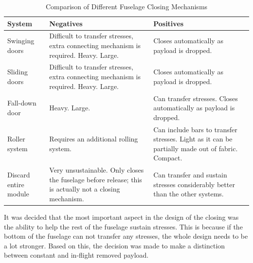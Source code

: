 \begin{table}[ht]
    \centering
    \caption{Comparison of Different Fuselage Closing Mechanisms}
    \label{tab:fuse_clos_comp}
    \begin{tabularx}{\textwidth}{>{\small}l L L}
    \toprule
    \textbf{System} & \textbf{Negatives} & \textbf{Positives}
    \\ \midrule
    Swinging doors & Difficult to transfer stresses, extra connecting mechanism is required. Heavy. Large. &  Closes automatically as payload is dropped.  
    \\ \hdashline
    Sliding doors & Difficult to transfer stresses, extra connecting mechanism is required. Heavy. Large. &  Closes automatically as payload is dropped.
    \\ \hdashline
    Fall-down door & Heavy. Large. & Can transfer stresses. Closes automatically as payload is dropped. 
    \\ \hdashline
    Roller system & Requires an additional rolling system. & Can include bars to transfer stresses. Light as it can be partially made out of fabric. Compact.
    \\ \hdashline
    Discard entire module & Very unsustainable. Only closes the fuselage before release; this is actually not a closing mechanism. & Can transfer and sustain stresses considerably better than the other systems. 
    \\ \bottomrule
    \end{tabularx}
\end{table}


It was decided that the most important aspect in the design of the closing was the ability to help the rest of the fuselage sustain stresses. This is because if the bottom of the fuselage can not transfer any stresses, the whole design needs to be a lot stronger. Based on this, the decision was made to make a distinction between constant and in-flight removed payload.

